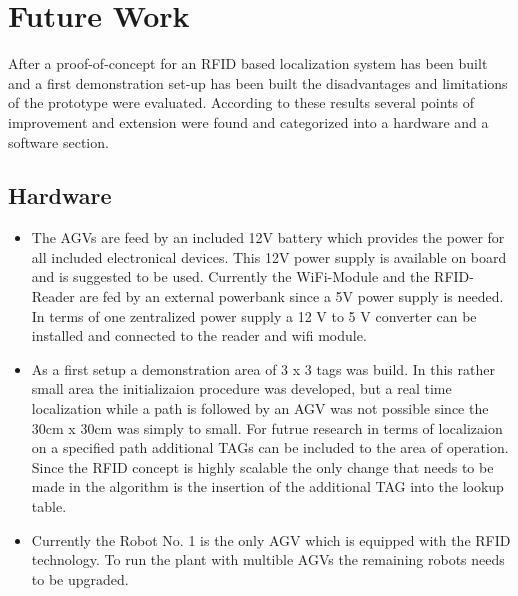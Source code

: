 \section{Future Work}\label{Sec_fut}
After a proof-of-concept for an RFID based localization system has been built and a first demonstration set-up has been built the disadvantages and limitations of the prototype were evaluated. According to these results several points of improvement and extension were found and categorized into a hardware and a software section. 
\subsection{Hardware}
\begin{itemize}
\item The AGVs are feed by an included 12V battery which provides the power for all included electronical devices. This 12V power supply is available on board and is suggested to be used. Currently the WiFi-Module and the RFID-Reader are fed by an external powerbank since a 5V power supply is needed. In terms of one zentralized power supply a 12 V to 5 V converter can be installed and connected to the reader and wifi module.
\item As a first setup a demonstration area of 3 x 3 tags was build. In this rather small area the initializaion procedure was developed, but a real time localization while a path is followed by an AGV was not possible since the 30cm x 30cm was simply to small. For futrue research in terms of localizaion on a specified path additional TAGs can be included to the area of operation. Since the RFID concept is highly scalable the only change that needs to be made in the algorithm is the insertion of the additional TAG into the lookup table.
\item Currently the Robot No. 1 is the only AGV which is equipped with the RFID technology. To run the plant with multible AGVs the remaining robots needs to be upgraded.\\
\end{itemize}
